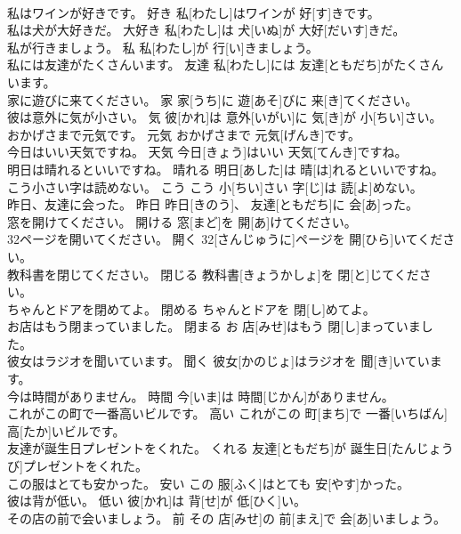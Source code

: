 \documentclass[8pt]{extreport}
\begin{document}
\begin{CJK}{UTF8}{min}
\\	私はワインが好きです。	好き	私[わたし]はワインが 好[す]きです。	
\\	私は犬が大好きだ。	大好き	私[わたし]は 犬[いぬ]が 大好[だいす]きだ。	
\\	私が行きましょう。	私	私[わたし]が 行[い]きましょう。	
\\	私には友達がたくさんいます。	友達	私[わたし]には 友達[ともだち]がたくさんいます。	
\\	家に遊びに来てください。	家	家[うち]に 遊[あそ]びに 来[き]てください。	
\\	彼は意外に気が小さい。	気	彼[かれ]は 意外[いがい]に 気[き]が 小[ちい]さい。	
\\	おかげさまで元気です。	元気	おかげさまで 元気[げんき]です。	
\\	今日はいい天気ですね。	天気	今日[きょう]はいい 天気[てんき]ですね。	
\\	明日は晴れるといいですね。	晴れる	明日[あした]は 晴[は]れるといいですね。	
\\	こう小さい字は読めない。	こう	こう 小[ちい]さい 字[じ]は 読[よ]めない。	
\\	昨日、友達に会った。	昨日	昨日[きのう]、 友達[ともだち]に 会[あ]った。	
\\	窓を開けてください。	開ける	窓[まど]を 開[あ]けてください。	
\\	32ページを開いてください。	開く	32[さんじゅうに]ページを 開[ひら]いてください。	
\\	教科書を閉じてください。	閉じる	教科書[きょうかしょ]を 閉[と]じてください。	
\\	ちゃんとドアを閉めてよ。	閉める	ちゃんとドアを 閉[し]めてよ。	
\\	お店はもう閉まっていました。	閉まる	お 店[みせ]はもう 閉[し]まっていました。	
\\	彼女はラジオを聞いています。	聞く	彼女[かのじょ]はラジオを 聞[き]いています。	
\\	今は時間がありません。	時間	今[いま]は 時間[じかん]がありません。	
\\	これがこの町で一番高いビルです。	高い	これがこの 町[まち]で 一番[いちばん] 高[たか]いビルです。	
\\	友達が誕生日プレゼントをくれた。	くれる	友達[ともだち]が 誕生日[たんじょうび]プレゼントをくれた。	
\\	この服はとても安かった。	安い	この 服[ふく]はとても 安[やす]かった。	
\\	彼は背が低い。	低い	彼[かれ]は 背[せ]が 低[ひく]い。	
\\	その店の前で会いましょう。	前	その 店[みせ]の 前[まえ]で 会[あ]いましょう。	

\end{CJK}
\end{document}
